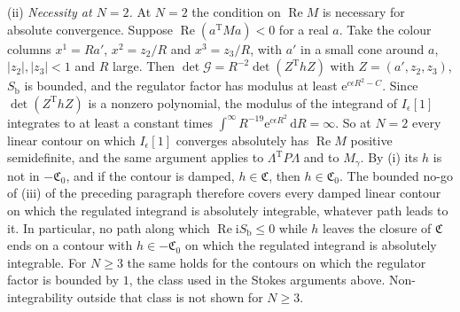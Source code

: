 (ii) \emph{Necessity at \(N=2\).} At \(N=2\) the condition on \(\operatorname{Re}M\) is necessary for absolute convergence. Suppose \(\operatorname{Re}(a^{\mathrm T}Ma)<0\) for a real \(a\). Take the colour columns \(x^1=Ra'\), \(x^2=z_2/R\) and \(x^3=z_3/R\), with \(a'\) in a small cone around \(a\), \(|z_2|,|z_3|<1\) and \(R\) large. Then \(\det\mathcal G=R^{-2}\det(Z^{\mathrm T}hZ)\) with \(Z=(a',z_2,z_3)\), \(S_{\mathrm b}\) is bounded, and the regulator factor has modulus at least \(\mathrm e^{c\epsilon R^2-C}\). Since \(\det(Z^{\mathrm T}hZ)\) is a nonzero polynomial, the modulus of the integrand of \(I_\epsilon[1]\) integrates to at least a constant times \(\int^\infty R^{-19}\mathrm e^{c\epsilon R^2}\,\mathrm dR=\infty\). So at \(N=2\) every linear contour on which \(I_\epsilon[1]\) converges absolutely has \(\operatorname{Re}M\) positive semidefinite, and the same argument applies to \(\Lambda^{\mathrm T}P\Lambda\) and to \(M_\gamma\). By (i) its \(h\) is not in \(-\mathfrak C_0\), and if the contour is damped, \(h\in\mathfrak C\), then \(h\in\mathfrak C_0\). The bounded no-go of (iii) of the preceding paragraph therefore covers every damped linear contour on which the regulated integrand is absolutely integrable, whatever path leads to it. In particular, no path along which \(\operatorname{Re}\mathrm iS_{\mathrm b}\le0\) while \(h\) leaves the closure of \(\mathfrak C\) ends on a contour with \(h\in-\mathfrak C_0\) on which the regulated integrand is absolutely integrable. For \(N\ge3\) the same holds for the contours on which the regulator factor is bounded by \(1\), the class used in the Stokes arguments above. Non-integrability outside that class is not shown for \(N\ge3\).

